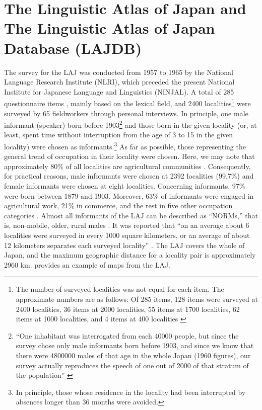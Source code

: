 \documentclass[output=paper]{LSP/langsci}
\begin{document}
\section{ The Linguistic Atlas of Japan and The Linguistic Atlas of Japan Database (LAJDB)}

The survey for the LAJ was conducted from 1957 to 1965 by the National Language Research Institute (NLRI), which preceded the present National Institute for Japanese Language and Linguistics (NINJAL). A total of 285 questionnaire items \citep[105--118]{kokuritsu_kokugo_kenkyujo_nlri_nihon_1966}, mainly based on the lexical field, and 2400 localities\footnote{The number of surveyed localities was not equal for each item. The approximate numbers are as follows: Of 285 items, 128 items were surveyed at 2400 localities, 36 items at 2000 localities, 55 items at 1700 localities, 62 items at 1000 localities, and 4 items at 400 localities \citep[22, 41]{kokuritsu_kokugo_kenkyujo_nlri_nihon_1966}} were surveyed by 65 fieldworkers through personal interviews. In principle, one male informant (speaker) born before 1903\footnote{“One inhabitant was interrogated from each 40000 people, but since the survey chose only male informants born before 1903, and since we know that there were 4800000 males of that age in the whole Japan (1960 figures), our survey actually reproduces the speech of one out of 2000 of that stratum of the population” \citep[41--42]{kokuritsu_kokugo_kenkyujo_nlri_nihon_1966}} and those born in the given locality (or, at least, spent time without interruption from the age of 3 to 15 in the given locality) were chosen as informants.\footnote{In principle, those whose residence in the locality had been interrupted by absences longer than 36 months were avoided.} As far as possible, those representing the general trend of occupation in their locality were chosen. Here, we may note that approximately 80\% of all localities are agricultural communities \citep[22, 42]{kokuritsu_kokugo_kenkyujo_nlri_nihon_1966}. Consequently, for practical reasons, male informants were chosen at 2392 localities (99.7\%) and female informants were chosen at eight localities. Concerning informants, 97\% were born between 1879 and 1903. Moreover, 63\% of informants were engaged in agricultural work, 21\% in commerce, and the rest in five other occupation categories \citep[24--26, 42, 43]{kokuritsu_kokugo_kenkyujo_nlri_nihon_1966}. Almost all informants of the LAJ can be described as “NORMs,” that is, non-mobile, older, rural males \citep[29]{chambers_dialectology_1998}. It was reported that “on an average about 6 localities were surveyed in every 1000 square kilometers, or an average of about 12 kilometers separates each surveyed locality” \citep[41]{kokuritsu_kokugo_kenkyujo_nlri_nihon_1966}. The LAJ covers the whole of Japan, and the maximum geographic distance for a locality pair is approximately 2960 km.  provides an example of maps from the LAJ.
\end{document}
